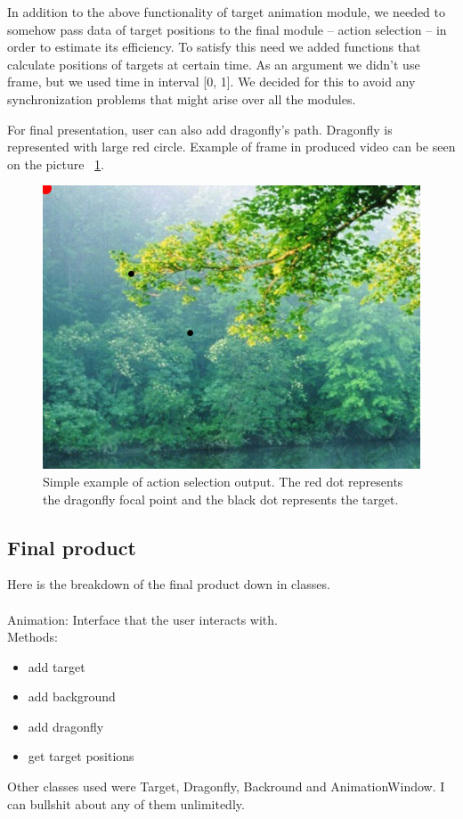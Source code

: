 \documentclass[hidelinks,a4paper,11pt]{article}
\begin{document}
In addition to the above functionality of target animation module, we needed to somehow pass data of target positions to the final module – action selection – in order to estimate its efficiency. To satisfy this need we added functions that calculate positions of targets at certain time. As an argument we didn't use frame, but we used time in interval [0, 1]. We decided for this to avoid any synchronization problems that might arise over all the modules.

For final presentation, user can also add dragonfly's path. Dragonfly is represented with large red circle.
Example of frame in produced video can be seen on the picture  ~\ref{target_animation_example}.

\begin{figure}[hb]
\centering
\includegraphics[scale = 0.3]{example}
\caption{Simple example of action selection output. The red dot represents the dragonfly focal point and the black dot represents the target.}
\label{target_animation_example}
\end{figure}

\newpage

\subsection{Final product}

Here is the breakdown of the final product down in classes.
\\
\\
Animation:
Interface that the user interacts with.
\\
Methods:
\begin{itemize}
\item add target
\item add background
\item add dragonfly
\item get target positions
\end{itemize}

Other classes used were Target, Dragonfly, Backround and AnimationWindow. I can bullshit about any of them unlimitedly.



\end{document}
